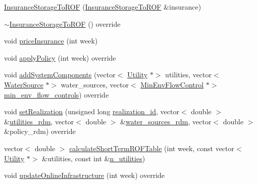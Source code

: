 \begin{DoxyCompactItemize}
\item 
\mbox{\hyperlink{classInsuranceStorageToROF_a5229c6bbb6da8268017c71bacec70f67_a5229c6bbb6da8268017c71bacec70f67}{Insurance\+Storage\+To\+R\+OF}} (\mbox{\hyperlink{classInsuranceStorageToROF}{Insurance\+Storage\+To\+R\+OF}} \&insurance)
\item 
\mbox{\hyperlink{classInsuranceStorageToROF_aba2143897e3ec32d698d25a1aa572a73_aba2143897e3ec32d698d25a1aa572a73}{$\sim$\+Insurance\+Storage\+To\+R\+OF}} () override
\item 
void \mbox{\hyperlink{classInsuranceStorageToROF_a2519f93b9db551105d9a7913d0db9540_a2519f93b9db551105d9a7913d0db9540}{price\+Insurance}} (int week)
\item 
void \mbox{\hyperlink{classInsuranceStorageToROF_a17aa84e0559793b3c463c468dfda3753_a17aa84e0559793b3c463c468dfda3753}{apply\+Policy}} (int week) override
\item 
void \mbox{\hyperlink{classInsuranceStorageToROF_ac7d317a7f189739275960e4f021108d8_ac7d317a7f189739275960e4f021108d8}{add\+System\+Components}} (vector$<$ \mbox{\hyperlink{classUtility}{Utility}} $\ast$$>$ utilities, vector$<$ \mbox{\hyperlink{classWaterSource}{Water\+Source}} $\ast$$>$ water\+\_\+sources, vector$<$ \mbox{\hyperlink{classMinEnvFlowControl}{Min\+Env\+Flow\+Control}} $\ast$$>$ \mbox{\hyperlink{classContinuityModel_afc991e5c0d144020e49a97751a04b302_afc991e5c0d144020e49a97751a04b302}{min\+\_\+env\+\_\+flow\+\_\+controls}}) override
\item 
void \mbox{\hyperlink{classInsuranceStorageToROF_a6318c3dca8b0c4d568eac494e5ccf712_a6318c3dca8b0c4d568eac494e5ccf712}{set\+Realization}} (unsigned long \mbox{\hyperlink{classContinuityModel_a7b6c99bf256f6c6b633ebb78282f43c7_a7b6c99bf256f6c6b633ebb78282f43c7}{realization\+\_\+id}}, vector$<$ double $>$ \&\mbox{\hyperlink{classContinuityModel_aa4a00b76da6295d2faa11e3dcaea1896_aa4a00b76da6295d2faa11e3dcaea1896}{utilities\+\_\+rdm}}, vector$<$ double $>$ \&\mbox{\hyperlink{classContinuityModel_ab7b8fa93a6f56b328e425e1ead6cfefa_ab7b8fa93a6f56b328e425e1ead6cfefa}{water\+\_\+sources\+\_\+rdm}}, vector$<$ double $>$ \&policy\+\_\+rdm) override
\item 
vector$<$ double $>$ \mbox{\hyperlink{classInsuranceStorageToROF_a4a50c4b15aba302fe1e928fb0cc66d32_a4a50c4b15aba302fe1e928fb0cc66d32}{calculate\+Short\+Term\+R\+O\+F\+Table}} (int week, const vector$<$ \mbox{\hyperlink{classUtility}{Utility}} $\ast$$>$ \&utilities, const int \&\mbox{\hyperlink{classContinuityModel_a6df6198ebc99a099df08f4b8ce6b52b9_a6df6198ebc99a099df08f4b8ce6b52b9}{n\+\_\+utilities}})
\item 
void \mbox{\hyperlink{classInsuranceStorageToROF_a5870934b8b33e1d872eca7b0940398ac_a5870934b8b33e1d872eca7b0940398ac}{update\+Online\+Infrastructure}} (int week) override
\end{DoxyCompactItemize}
